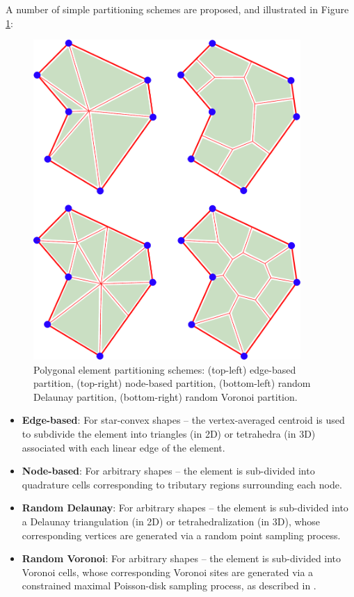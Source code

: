 	A number of simple partitioning schemes are proposed, and illustrated in Figure \ref{fig:partitioning_types}:
	\begin{figure} [!ht]
		\centering
		\includegraphics[width = 4.0in]{figures/partition_types.pdf}
		\caption{Polygonal element partitioning schemes: (top-left) edge-based partition, (top-right) node-based partition, (bottom-left) random Delaunay partition, (bottom-right) random Voronoi partition.}
		\label{fig:partitioning_types}
	\end{figure}
	\begin{itemize}
		\item \textbf{Edge-based}: For star-convex shapes -- the vertex-averaged centroid is used to subdivide the element into triangles (in 2D) or tetrahedra (in 3D) associated with each linear edge of the element.
		\item \textbf{Node-based}: For arbitrary shapes -- the element is sub-divided into quadrature cells corresponding to tributary regions surrounding each node.
		\item \textbf{Random Delaunay}: For arbitrary shapes -- the element is sub-divided into a Delaunay triangulation (in 2D) or tetrahedralization (in 3D), whose corresponding vertices are generated via a random point sampling process.
		\item \textbf{Random Voronoi}: For arbitrary shapes -- the element is sub-divided into Voronoi cells, whose corresponding Voronoi sites are generated via a constrained maximal Poisson-disk sampling process, as described in \cite{Ebeida:11}.
	\end{itemize}
	
